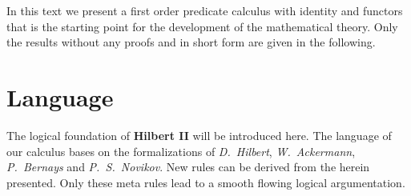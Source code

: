 \documentclass[a4paper,german,10pt,twoside]{book}
\theoremstyle{definition}
\theoremstyle{remark}
\begin{document}
\par
In this text we present a first order predicate calculus with identity and functors
that is the starting point for the development of the mathematical theory.
Only the results without any proofs and in short form are given in the following.


\chapter{Language} \label{chapter3} \hypertarget{chapter3}{}

The logical foundation of \textbf{Hilbert II} will be introduced here.
The language of our calculus bases on the formalizations of \emph{D.~Hilbert}, \emph{W.~Ackermann}, \emph{P.~Bernays} and \emph{P.~S.~Novikov}. New rules can be derived from the herein presented. Only these meta rules lead to a smooth flowing logical argumentation.
\end{document}

